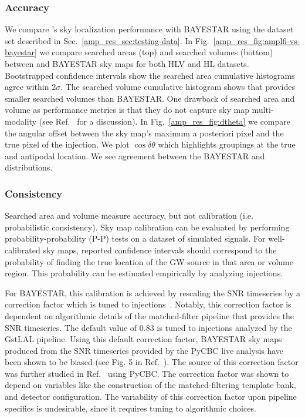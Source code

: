 \begin{refsection}
\subsubsection{Accuracy}
We compare \amplfi's sky localization performance with BAYESTAR using the dataset set described in Sec.~\ref{amp_res_sec:testing-data}. 
In Fig.~\ref{amp_res_fig:amplfi-vs-bayestar} we compare searched areas (top) and searched volumes (bottom) between \amplfi and BAYESTAR sky maps for both HLV and HL datasets. 
Bootstrapped confidence intervals show the searched area cumulative histograms agree within 2$\sigma$. 
The searched volume cumulative histogram shows that \amplfi provides smaller searched volumes than BAYESTAR. 
One drawback of searched area and volume as performance metrics is that they do not capture sky map multi-modality (see Ref.~\cite{Essick:2014wwa} for a discussion).
In Fig.~\ref{amp_res_fig:dtheta} we compare the angular offset between the sky map's maximum a posteriori pixel and the true pixel of the injection. 
We plot $\cos \delta \theta$ which highlights groupings at the true and antipodal location. 
We see agreement between the BAYESTAR and \amplfi distributions.

\subsubsection{Consistency}
Searched area and volume measure accuracy, but not calibration (i.e. probabilistic consistency). 
Sky map calibration can be evaluated by performing probability-probability (P-P) tests on a dataset of simulated signals. 
For well-calibrated sky maps, reported confidence intervals should correspond to the probability of finding the true location of the GW source in that area or volume region. 
This probability can be estimated empirically by analyzing injections. 

For BAYESTAR, this calibration is achieved by rescaling the SNR timeseries by a correction factor which is tuned to injections~\cite{Singer_2016}. 
Notably, this correction factor is dependent on algorithmic details of the matched-filter pipeline that provides the SNR timeseries. 
The default value of 0.83 is tuned to injections analyzed by the GstLAL pipeline. 
Using this default correction factor, BAYESTAR sky maps produced from the SNR timeseries provided by the PyCBC live analysis have been shown to be biased (see Fig. 5 in Ref.~\cite{Nitz_2018}). 
The source of this correction factor was further studied in Ref.~\cite{Duverne_2024} using PyCBC. 
The correction factor was shown to depend on variables like the construction of the matched-filtering template bank, and detector configuration. 
The variability of this correction factor upon pipeline specifics is undesirable, since it requires tuning to algorithmic choices.


\end{refsection}
